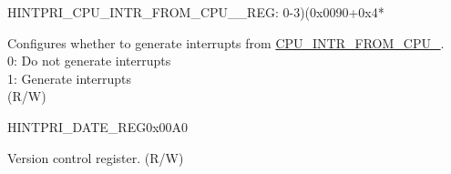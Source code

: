 \begin{register}{H}{INTPRI\_CPU\_INTR\_FROM\_CPU\_\_REG}{: 0-3)(0x0090+0x4*}\label{regdesc:INTPRICPUINTRFROMCPUNREG}
%
%
\regnewline%
\begin{regdesc}\begin{reglist}
\label{fielddesc:INTPRICPUINTRFROMCPUN}\item [INTPRI\_CPU\_INTR\_FROM\_CPU\_\regindex{n}]  Configures whether to generate interrupts from \hyperref[CPUINTRFROMCPU0]{CPU\_INTR\_FROM\_CPU\_}.\\
0: Do not generate interrupts\\
1: Generate interrupts\\
(R/W)
\end{reglist}\end{regdesc}
\end{register}


\begin{register}{H}{INTPRI\_DATE\_REG}{0x00A0}\label{regdesc:INTPRIDATEREG}
%
%
\regnewline%
\begin{regdesc}\begin{reglist}
\label{fielddesc:INTPRIDATE}\item [INTPRI\_DATE] Version control register. (R/W)
\end{reglist}\end{regdesc}
\end{register}

